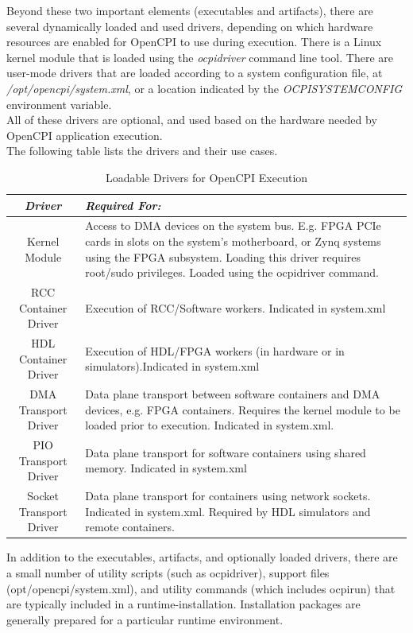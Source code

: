 \documentclass[10pt, a4paper, oneside]{article}
\renewcommand*{\arraystretch}{2.5}%
\renewcommand\_{\textunderscore\allowbreak} %
\begin{document}
Beyond these two important elements (executables and artifacts), there are several dynamically loaded and used drivers, depending on which hardware resources are enabled for OpenCPI to use during execution.  There is a Linux kernel module that is loaded using the \emph{ocpidriver} command line tool.  There are user-mode drivers that are loaded according to a system configuration file, at \emph{/opt/opencpi/system.xml}, or a location indicated by the \emph{OCPI\_SYSTEM\_CONFIG} environment variable.\\
All of these drivers are optional, and used based on the hardware needed by OpenCPI application execution. \\

The following table lists the drivers and their use cases.\\
\begin{table}[h!]
\caption{Loadable Drivers for OpenCPI Execution}\label{Loadable Drivers for OpenCPI Execution}
\renewcommand*{\arraystretch}{2.5}
\begin{tabular} { |c|p{12cm}|}
\hline
\emph{Driver} & \emph{Required For:}\\
\hline
Kernel Module &	Access to DMA devices on the system bus.  E.g. FPGA PCIe cards in slots on the system's motherboard, or Zynq systems using the FPGA subsystem.  Loading this driver requires root/sudo privileges.
Loaded using the ocpidriver command.\\ 
\hline
RCC Container Driver & Execution of RCC/Software workers.  Indicated in system.xml\\ 
\hline 
HDL Container Driver &	Execution of HDL/FPGA workers (in hardware or in simulators).Indicated in system.xml\\
\hline 
DMA Transport Driver &	Data plane transport between software containers and DMA devices, e.g. FPGA containers.  Requires the kernel module to be loaded prior to execution.  Indicated in system.xml.\\ 
\hline 
PIO Transport Driver	& Data plane transport for software containers using shared memory.  Indicated in system.xml\\ 
\hline 
Socket Transport Driver &	Data plane transport for containers using network sockets.  Indicated in system.xml.  Required by HDL simulators and remote containers.\\ 
\hline
\end{tabular}
\end{table}

In addition to the executables, artifacts, and optionally loaded drivers, there are a small number of utility scripts (such as ocpidriver), support files (\/opt/opencpi/system.xml), and utility commands (which includes ocpirun) that are typically included in a runtime-installation.  Installation packages are generally prepared for a particular runtime environment.\\
\end{document}
